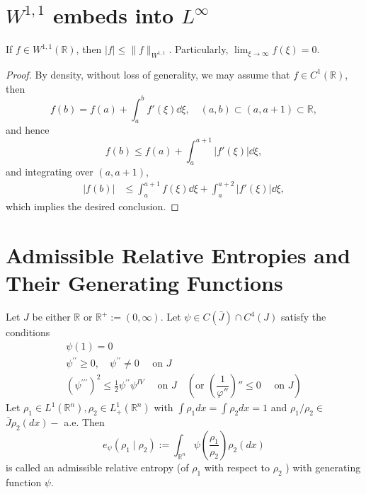 \section{\texorpdfstring{$W^{1,1}$}{W1,1} embeds into \texorpdfstring{$L^\infty$}{bounded space}}
\begin{lemma}
	If $f\in W^{1,1}(\mathbb{R})$, then $|f|\leq \|f\|_{W^{1,1}}$.
	Particularly, $\lim_{\xi\to\infty}f(\xi) = 0$.
\end{lemma}
\begin{proof}
	By density, without loss of generality,
	we may assume that $f\in C^1(\mathbb{R})$, then
	\[
	f(b) = f(a) + \int_a^b f'(\xi)\dd \xi,\quad (a,b)\subset(a, a+1)\subset\mathbb{R},
	\]
	and hence
	\[
	f(b) \leq f(a) + \int_a^{a+1}|f'(\xi)|\dd\xi,
	\]
	and integrating over $(a, a+1)$,
	\begin{align*}
		|f(b)| &\leq \int_a^{a+1}f(\xi)\dd\xi + \int_a^{a+2}|f'(\xi)|\dd\xi,
	\end{align*}
	which implies the desired conclusion.
\end{proof}

\section{Admissible Relative Entropies and Their Generating
	Functions}

\begin{definition}
	 Let $J$ be either $\mathbb{R}$ or $\mathbb{R}^{+}:=(0, \infty) .$ Let $\psi \in C(\bar{J}) \cap C^{4}(J)$ satisfy the conditions
	$$
	\begin{array}{l}
	\psi(1)=0 \\
	\psi^{\prime \prime} \geq 0, \quad \psi^{\prime \prime} \neq 0 \quad \text { on } J \\
	\left(\psi^{\prime \prime \prime}\right)^{2} \leq \frac{1}{2} \psi^{\prime \prime} \psi^{I V} \quad \text { on } J \quad (\text{or } (\dfrac1{\varphi''})''\leqslant0 \quad \text { on } J)
	\end{array}
	$$
	Let $\rho_{1} \in L^{1}\left(\mathbb{R}^{n}\right), \rho_{2} \in L_{+}^{1}\left(\mathbb{R}^{n}\right)$ with $\int \rho_{1} d x=\int \rho_{2} d x=1$ and $\rho_{1} / \rho_{2} \in$
	$\bar{J} \rho_{2}(d x)-$ a.e. Then
	$$
	e_{\psi}\left(\rho_{1} \mid \rho_{2}\right):=\int_{\mathbb{R}^{n}} \psi\left(\frac{\rho_{1}}{\rho_{2}}\right) \rho_{2}(d x)
	$$
	is called an admissible relative entropy (of $\rho_{1}$ with respect to $\rho_{2}$ ) with generating function $\psi$.
\end{definition}

